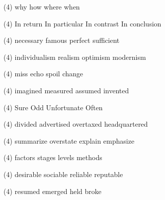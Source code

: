 \item
\begin{tasks}(4)
	\task why
	\task how
	\task where
	\task when
\end{tasks}
\item
\begin{tasks}(4)
	\task In return
	\task In particular
	\task In contrast
	\task In conclusion
\end{tasks}
\item
\begin{tasks}(4)
	\task necessary
	\task famous
	\task perfect
	\task sufficient
\end{tasks}
\item
\begin{tasks}(4)
	\task individualism
	\task realism
	\task optimism
	\task modernism
\end{tasks}
\item
\begin{tasks}(4)
	\task miss
	\task echo
	\task spoil
	\task change
\end{tasks}
\item
\begin{tasks}(4)
	\task imagined
	\task measured
	\task assumed
	\task invented
\end{tasks}
\item
\begin{tasks}(4)
	\task Sure
	\task Odd
	\task Unfortunate
	\task Often
\end{tasks}
\item
\begin{tasks}(4)
	\task divided
	\task advertised
	\task overtaxed
	\task headquartered
\end{tasks}
\item
\begin{tasks}(4)
	\task summarize
	\task overstate
	\task explain
	\task emphasize
\end{tasks}
\item
\begin{tasks}(4)
	\task factors
	\task stages
	\task levels
	\task methods
\end{tasks}
\item
\begin{tasks}(4)
	\task desirable
	\task sociable
	\task reliable
	\task reputable
\end{tasks}
\item
\begin{tasks}(4)
	\task resumed
	\task emerged
	\task held
	\task broke
\end{tasks}
